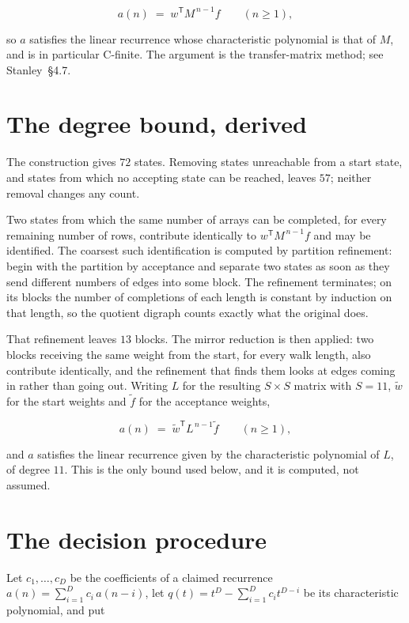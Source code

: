 \documentclass[11pt]{article}
\theoremstyle{definition}
\begin{document}
\[a(n) \;=\; w^{\mathsf T} M^{\,n-1} f \qquad (n \ge 1),\]

so $a$ satisfies the linear recurrence whose characteristic polynomial is that of $M$, and is in particular C-finite. The argument is the transfer-matrix method; see Stanley~\S4.7.

\section{The degree bound, derived}

The construction gives $72$ states. Removing states unreachable from a start state, and states from which no accepting state can be reached, leaves $57$; neither removal changes any count.

Two states from which the same number of arrays can be completed, for every remaining number of rows, contribute identically to $w^{\mathsf T}M^{\,n-1}f$ and may be identified. The coarsest such identification is computed by partition refinement: begin with the partition by acceptance and separate two states as soon as they send different numbers of edges into some block. The refinement terminates; on its blocks the number of completions of each length is constant by induction on that length, so the quotient digraph counts exactly what the original does.

That refinement leaves $13$ blocks. The mirror reduction is then applied: two blocks receiving the same weight from the start, for every walk length, also contribute identically, and the refinement that finds them looks at edges coming in rather than going out. Writing $L$ for the resulting $S \times S$ matrix with $S = 11$, $\tilde w$ for the start weights and $\tilde f$ for the acceptance weights,

\[a(n) \;=\; \tilde w^{\mathsf T} L^{\,n-1} \tilde f \qquad (n \ge 1),\]

and $a$ satisfies the linear recurrence given by the characteristic polynomial of $L$, of degree $11$. This is the only bound used below, and it is computed, not assumed.

\section{The decision procedure}

Let $c_1,\dots,c_D$ be the coefficients of a claimed recurrence $a(n) = \sum_{i=1}^{D} c_i\,a(n-i)$, let $q(t) = t^{D} - \sum_{i=1}^{D} c_i t^{D-i}$ be its characteristic polynomial, and put
\end{document}
